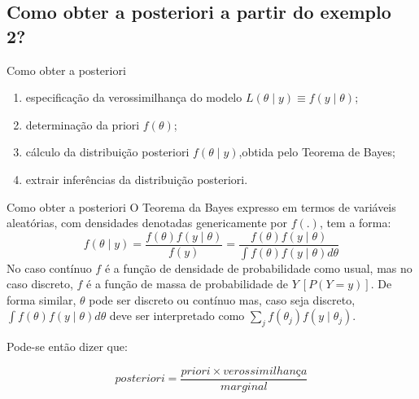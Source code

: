 \documentclass{beamer}
\theoremstyle{definition}
\begin{document}
\subsection{Como obter a posteriori a partir do exemplo 2?}
\begin{frame}{Como obter a posteriori}
\vspace{0.5cm}
\begin{enumerate}
    \item especificação da verossimilhança do modelo $L(\theta \mid y) \equiv f(y \mid \theta)$;
    \item determinação da priori $f(\theta)$;
    \item cálculo da distribuição posteriori $f(\theta \mid y)$,obtida pelo Teorema de Bayes;
    \item extrair inferências da distribuição posteriori.
\end{enumerate}
\end{frame}

    \begin{frame}{Como obter a posteriori}
    O Teorema da Bayes expresso em termos de variáveis aleatórias, com densidades denotadas genericamente por $f(.)$, tem a forma:
    \begin{equation}
    f(\theta \mid y)=\frac{f(\theta) f(y \mid \theta)}{f(y)}=\frac{f(\theta) f(y \mid \theta)}{\int f(\theta) f(y \mid \theta) d \theta}
    \end{equation}
    No caso contínuo $f$ é a função de densidade de probabilidade como usual, mas no caso discreto, $f$ é a função de massa de probabilidade de $Y~[P(Y=y)]$. De forma similar, $\theta$ pode ser discreto ou contínuo mas, caso seja discreto, $\int f(\theta) f(y \mid \theta) d \theta$ deve ser interpretado como $\sum_j f\left(\theta_j\right) f\left(y \mid \theta_j\right)$.
    
    Pode-se então dizer que:
    
    \begin{equation}
        posteriori=\frac{priori \times verossimilhança}{marginal}
    \end{equation}
    
    \end{frame}
\end{document}
